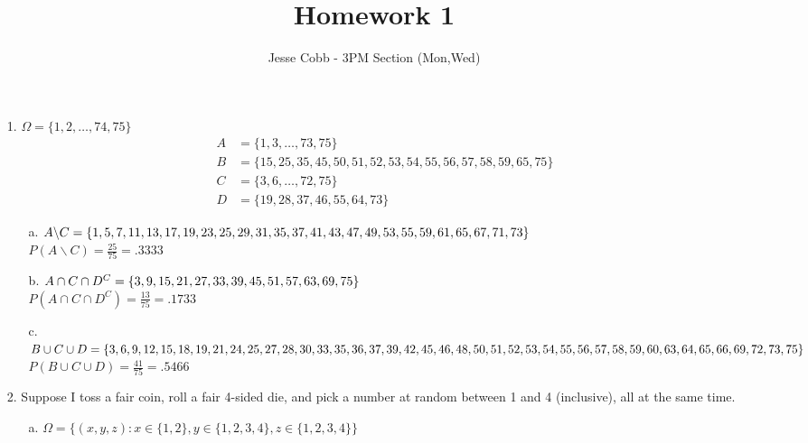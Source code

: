 \documentclass[11pt]{amsart}
\theoremstyle{definition}
\begin{document}
\title{Homework 1}

\author{Jesse Cobb - 3PM Section (Mon,Wed)}

\maketitle

\begin{itemize}

\item[1.] $\Omega=\{1,2,\ldots ,74,75\}$
\begin{align*}
    A &= \{1,3,\ldots,73,75\} \\
    B &= \{15,25,35,45,50,51,52,53,54,55,56,57,58,59,65,75\} \\
    C &= \{3,6,\ldots,72,75\} \\
    D &= \{19,28,37,46,55,64,73\}
\end{align*}
\begin{itemize}
    \item[a.] $A\backslash C=\\
                \{1,5,7,11,13,17,19,23,
                  25,29,31,35,37,41,43, \\
                  47,49,53,55,59,61,65,
                  67,71,73\}$ \\
              $P(A\backslash C)=\frac{25}{75}=.3333$

    \item[b.] $A\cap C\cap D^C=\\
                \{3,9,15,21,27,33,39,
                45,51,57,63,69,75\}$ \\
              $P(A\cap C\cap D^C)=\frac{13}{75}=.1733$

    \item[c.] $B\cup C\cup D=\\
                \{3,6,9,12,15,18,19,21,
                  24,25,27,28,30,33,35, \\
                  36,37,39,42,45,46,48,
                  50,51,52,53,54,55,56, \\
                  57,58,59,60,63,64,65,
                  66,69,72,73,75\}$ \\
             $P(B\cup C\cup D)=\frac{41}{75}=.5466$
\end{itemize}

\item[2.] Suppose I toss a fair coin, roll a fair 4-sided die, and pick a number at random between 1 and 4 (inclusive), all at the same time.
\begin{itemize}
    \item[a.]$\Omega=\{(x,y,z):x\in\{1,2\},y\in\{1,2,3,4\},z\in\{1,2,3,4\}\}$


\end{itemize}
\end{itemize}
\end{document}
